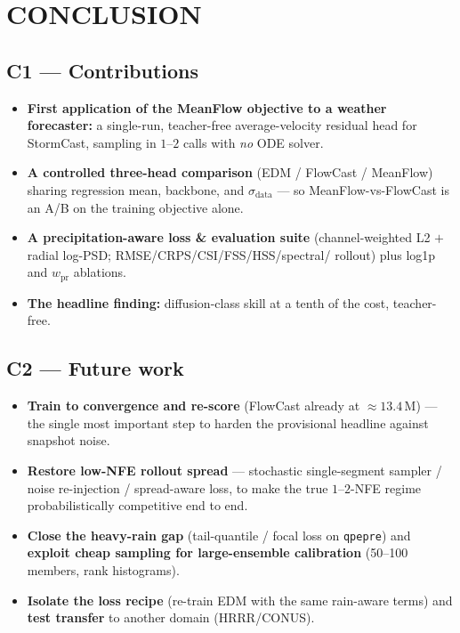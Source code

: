 \documentclass[11pt]{article}
\begin{document}
\section*{CONCLUSION}

\subsection*{C1 --- Contributions}
\begin{itemize}
  \item \textbf{First application of the MeanFlow objective to a weather
        forecaster:} a single-run, teacher-free average-velocity residual head
        for StormCast, sampling in $1$--$2$ calls with \emph{no} ODE solver.
  \item \textbf{A controlled three-head comparison} (EDM / FlowCast / MeanFlow)
        sharing regression mean, backbone, and $\sigma_{\text{data}}$ --- so
        MeanFlow-vs-FlowCast is an A/B on the training objective alone.
  \item \textbf{A precipitation-aware loss \& evaluation suite}
        (channel-weighted L2 $+$ radial log-PSD; RMSE/CRPS/CSI/FSS/HSS/spectral/
        rollout) plus log1p and $w_{\text{pr}}$ ablations.
  \item \textbf{The headline finding:} diffusion-class skill at a tenth of the
        cost, teacher-free.
\end{itemize}

\subsection*{C2 --- Future work}
\begin{itemize}
  \item \textbf{Train to convergence and re-score} (FlowCast already at
        $\approx 13.4$\,M) --- the single most important step to harden the
        provisional headline against snapshot noise.
  \item \textbf{Restore low-NFE rollout spread} --- stochastic single-segment
        sampler / noise re-injection / spread-aware loss, to make the true
        $1$--$2$-NFE regime probabilistically competitive end to end.
  \item \textbf{Close the heavy-rain gap} (tail-quantile / focal loss on
        \texttt{qpepre}) and \textbf{exploit cheap sampling for large-ensemble
        calibration} (50--100 members, rank histograms).
  \item \textbf{Isolate the loss recipe} (re-train EDM with the same rain-aware
        terms) and \textbf{test transfer} to another domain (HRRR/CONUS).
\end{itemize}
\end{document}
